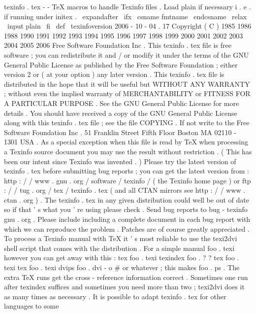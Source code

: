 %
texinfo
.
tex
-
-
TeX
macros
to
handle
Texinfo
files
.
%
%
Load
plain
if
necessary
i
.
e
.
if
running
under
initex
.
\
expandafter
\
ifx
\
csname
fmtname
\
endcsname
\
relax
\
input
plain
\
fi
%
\
def
\
texinfoversion
{
2006
-
10
-
04
.
17
}
%
%
Copyright
(
C
)
1985
1986
1988
1990
1991
1992
1993
1994
1995
%
1996
1997
1998
1999
2000
2001
2002
2003
2004
2005
2006
Free
%
Software
Foundation
Inc
.
%
%
This
texinfo
.
tex
file
is
free
software
;
you
can
redistribute
it
and
/
or
%
modify
it
under
the
terms
of
the
GNU
General
Public
License
as
%
published
by
the
Free
Software
Foundation
;
either
version
2
or
(
at
%
your
option
)
any
later
version
.
%
%
This
texinfo
.
tex
file
is
distributed
in
the
hope
that
it
will
be
%
useful
but
WITHOUT
ANY
WARRANTY
;
without
even
the
implied
warranty
%
of
MERCHANTABILITY
or
FITNESS
FOR
A
PARTICULAR
PURPOSE
.
See
the
GNU
%
General
Public
License
for
more
details
.
%
%
You
should
have
received
a
copy
of
the
GNU
General
Public
License
%
along
with
this
texinfo
.
tex
file
;
see
the
file
COPYING
.
If
not
write
%
to
the
Free
Software
Foundation
Inc
.
51
Franklin
Street
Fifth
Floor
%
Boston
MA
02110
-
1301
USA
.
%
%
As
a
special
exception
when
this
file
is
read
by
TeX
when
processing
%
a
Texinfo
source
document
you
may
use
the
result
without
%
restriction
.
(
This
has
been
our
intent
since
Texinfo
was
invented
.
)
%
%
Please
try
the
latest
version
of
texinfo
.
tex
before
submitting
bug
%
reports
;
you
can
get
the
latest
version
from
:
%
http
:
/
/
www
.
gnu
.
org
/
software
/
texinfo
/
(
the
Texinfo
home
page
)
or
%
ftp
:
/
/
tug
.
org
/
tex
/
texinfo
.
tex
%
(
and
all
CTAN
mirrors
see
http
:
/
/
www
.
ctan
.
org
)
.
%
The
texinfo
.
tex
in
any
given
distribution
could
well
be
out
%
of
date
so
if
that
'
s
what
you
'
re
using
please
check
.
%
%
Send
bug
reports
to
bug
-
texinfo
gnu
.
org
.
Please
include
including
a
%
complete
document
in
each
bug
report
with
which
we
can
reproduce
the
%
problem
.
Patches
are
of
course
greatly
appreciated
.
%
%
To
process
a
Texinfo
manual
with
TeX
it
'
s
most
reliable
to
use
the
%
texi2dvi
shell
script
that
comes
with
the
distribution
.
For
a
simple
%
manual
foo
.
texi
however
you
can
get
away
with
this
:
%
tex
foo
.
texi
%
texindex
foo
.
?
?
%
tex
foo
.
texi
%
tex
foo
.
texi
%
dvips
foo
.
dvi
-
o
#
or
whatever
;
this
makes
foo
.
ps
.
%
The
extra
TeX
runs
get
the
cross
-
reference
information
correct
.
%
Sometimes
one
run
after
texindex
suffices
and
sometimes
you
need
more
%
than
two
;
texi2dvi
does
it
as
many
times
as
necessary
.
%
%
It
is
possible
to
adapt
texinfo
.
tex
for
other
languages
to
some
